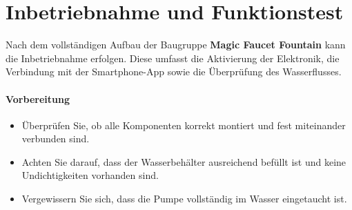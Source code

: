 %
%
%

\chapter{Inbetriebnahme und Funktionstest}
Nach dem vollständigen Aufbau der Baugruppe \textbf{Magic Faucet Fountain} kann die Inbetriebnahme erfolgen. Diese umfasst die Aktivierung der Elektronik, die Verbindung mit der Smartphone-App sowie die Überprüfung des Wasserflusses.

\subsubsection{Vorbereitung}
\begin{itemize}
	\item Überprüfen Sie, ob alle Komponenten korrekt montiert und fest miteinander verbunden sind.
	\item Achten Sie darauf, dass der Wasserbehälter ausreichend befüllt ist und keine Undichtigkeiten vorhanden sind.
	\item Vergewissern Sie sich, dass die Pumpe vollständig im Wasser eingetaucht ist.
\end{itemize}

